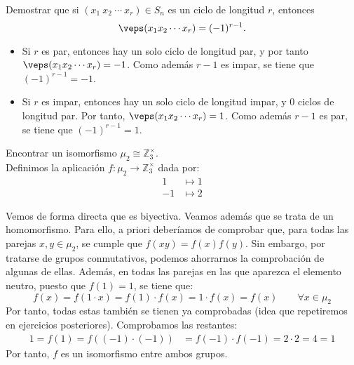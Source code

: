 \begin{ejercicio}\label{ej:2.24}
    Demostrar que si $(x_1\ x_2\ \cdots\ x_r) \in S_n$ es un ciclo de longitud $r$, entonces
    $$\veps(x_1x_2 \cdots x_r) = (-1)^{r - 1}.$$

    \begin{itemize}
        \item Si $r$ es par, entonces hay un solo ciclo de longitud par, y por tanto $\veps(x_1x_2 \cdots x_r) = -1$. Como además $r-1$ es impar, se tiene que $(-1)^{r-1}=-1$.
        
        \item Si $r$ es impar, entonces hay un solo ciclo de longitud impar, y 0 ciclos de longitud par. Por tanto, $\veps(x_1x_2 \cdots x_r) = 1$. Como además $r-1$ es par, se tiene que $(-1)^{r-1}=1$.
    \end{itemize}
\end{ejercicio}

\begin{ejercicio}\label{ej:2.25}
    Encontrar un isomorfismo $\mu_2 \cong \mathbb{Z}^{\times}_3$.\\

    Definimos la aplicación $f:\mu_2\to \mathbb{Z}^{\times}_3$ dada por:
    \begin{align*}
        1 &\mapsto 1\\
        -1 &\mapsto 2
    \end{align*}

    Vemos de forma directa que es biyectiva. Veamos además que se trata de un homomorfismo. Para ello, a priori deberíamos de comprobar que, para todas las parejas $x,y\in \mu_2$, se cumple que $f(xy)=f(x)f(y)$. Sin embargo, por tratarse de grupos conmutativos, podemos ahorrarnos la comprobación de algunas de ellas. Además, en todas las parejas en las que aparezca el elemento neutro, puesto que $f(1)=1$, se tiene que:
    \begin{equation*}
        f(x)=f(1\cdot x)=f(1)\cdot f(x)=1\cdot f(x)=f(x)\qquad \forall x\in \mu_2
    \end{equation*}
    Por tanto, todas estas también se tienen ya comprobadas (idea que repetiremos en ejercicios posteriores). Comprobamos las restantes:
    \begin{align*}
        1=f(1)=f((-1)\cdot (-1))&=f(-1)\cdot f(-1)=2\cdot 2=4=1
    \end{align*}
    Por tanto, $f$ es un isomorfismo entre ambos grupos.
\end{ejercicio}

